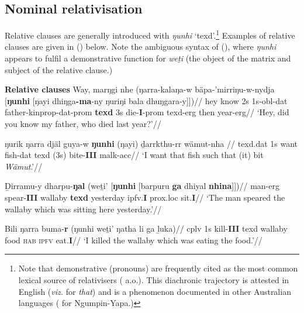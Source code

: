 \subsection{Nominal relativisation}


Relative clauses are generally introduced with \textit{ŋunhi} `\gls{texd}'.\footnote{Note that demonstrative (pronouns) are frequently cited as the most common lexical source of relativisers (\citealp[e.g.][]{Hendery2012,Diessel1999} a.o.). This diachronic trajectory is attested in English (\textit{viz.} for \textit{that}) and is a phenomenon documented in other Australian languages (\citealp[e.g.][]{McConvell2006} for Ngumpin-Yapa.)} Examples of relative clauses are given in (\nextx) below. Note the ambiguous syntax of (), where \textit{ŋunhi} appears to fulfil a demonstrative function for \textit{weṯi} (the object of the matrix and subject of the relative clause.)


\pex\textbf{Relative clauses}
\a\begingl\gla Way, marŋgi nhe (ŋarra-kalaŋa-w bäpa-'mirriŋu-w-nydja [\textbf{ŋunhi} [ŋayi dhiŋga\textbf{-ma}-ny ŋuriŋi bala dhuŋgara-y]])//
\glb hey know 2s 1s-\gls{obl}-\gls{dat} father-\gls{kinprop}-\gls{dat}-\gls{prom} \textbf{\gls{texd}} 3s die-\textbf{I}-\gls{prom} \gls{texd}-\gls{erg} then year-\gls{erg}//
\glft`Hey, did you know my father, who died last year?'//\endgl

\a\begingl\gla ŋurik ŋarra djäl \nogloss{(} guya-w \nogloss{[} \textbf{ŋunhi} \nogloss{[} (ŋayi) ḏarrkthu-rr wämut-nha \nogloss{]])}//
\glb \gls{texd}.\gls{dat} 1s want fish-\gls{dat} \gls{texd} (3s) bite-\textbf{III} \gls{malk}-\gls{acc}//
\glft`I want that fish such that (it) bit \textit{Wämut}.'//\endgl


\a\begingl\gla Ḏirramu-y dharpu-\textbf{ŋal} (weṯi' [\textbf{ŋunhi} [barpuru \textbf{ga} dhiyal \textbf{nhina}]])//
\glb man-\gls{erg} spear-\textbf{III} wallaby \textbf{\gls{texd}} yesterday \gls{ipfv}.\textbf{I} \gls{prox}.\gls{loc} sit.\textbf{I}//
\glft`The man speared the wallaby which was sitting here yesterday.'//\endgl

\a{}\begingl\gla Bili ŋarra buma-\textbf{r} (ŋunhi weṯi' ŋatha li ga ḻuka)//
\glb \gls{cplv} 1s kill-\textbf{III} \gls{texd} wallaby food \textsc{hab} \textsc{ipfv} eat.\textbf{I}//
\glft`I killed the wallaby which was eating the food.'//\endgl


